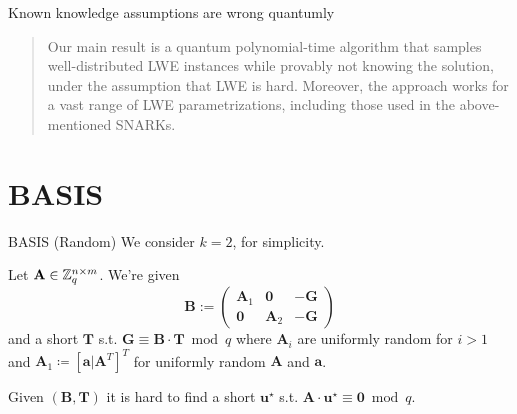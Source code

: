 \documentclass[xcolor=table,10pt,aspectratio=169]{beamer}
\renewcommand{\vec}[1]{\ensuremath{\mathbf{#1}}\xspace}
\providecommand{\mat}[1]{\ensuremath{\vec{#1}}\xspace}
\begin{document}
\begin{frame}[label={sec:org84ea0f5}]{Known knowledge assumptions are wrong quantumly}
\begin{quote}
Our main result is a quantum polynomial-time algorithm that samples well-distributed LWE instances while provably not knowing the solution, under the assumption that LWE is hard. Moreover, the approach works for a vast range of LWE parametrizations, including those used in the above-mentioned SNARKs.
\end{quote}

\end{frame}

\section{BASIS}
\label{sec:orga971918}
\begin{frame}[label={sec:org6efcec1}]{BASIS (Random)}
We consider \(k=2\), for simplicity.

\begin{definition}
Let \(\mat{A} \in \ZZ_{q}^{n \times m}\). We're given
\[
\vec{B} := \begin{pmatrix}\mat{A}_{1} & \vec{0} & - \vec{G}\\\vec{0} & \mat{A}_{2} & -\vec{G}\end{pmatrix}
\] and a short \(\vec{T}\) s.t. \(\vec{G} \equiv \vec{B} \cdot \vec{T} \bmod q\)
where \(\mat{A}_{i}\) are uniformly random for \(i>1\) and \(\mat{A}_{1} \coloneqq  [\vec{a} | \mat{A}^{T}]^{T}\) for uniformly random \(\mat{A}\) and \(\vec{a}\).

Given \((\vec{B}, \vec{T})\) it is hard to find a short \(\vec{u}^{\star}\) s.t. \(\mat{A} \cdot \vec{u}^{\star} \equiv \vec{0} \bmod q\).
\end{definition}

{\footnotesize {} \par}
\end{frame}
\end{document}
